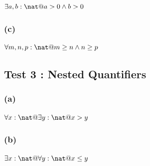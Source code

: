 \documentclass[a4paper,10pt,fleqn]{article}
\begin{document}
\noindent
$\exists a, b : \nat @ a > 0 \land b > 0$


\medskip

\subsubsection*{(c)}

\noindent
$\forall m, n, p : \nat @ m \geq n \land n \geq p$


\subsection*{Test 3 : Nested Quantifiers}

\subsubsection*{(a)}

\noindent
$\forall x : \nat @ \exists y : \nat @ x > y$


\medskip

\subsubsection*{(b)}

\noindent
$\exists x : \nat @ \forall y : \nat @ x \leq y$
\end{document}
